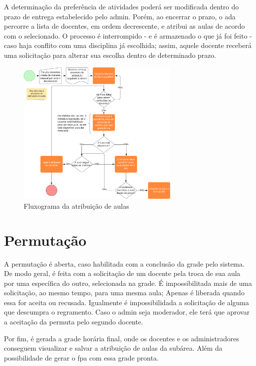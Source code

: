 A determinação da preferência de atividades poderá ser modificada dentro do prazo de entrega estabelecido pelo \gls{admin}. Porém, ao encerrar o prazo, o \ac{ada} percorre a lista de docentes, em ordem decrescente, e atribui as aulas de acordo com o selecionado. O processo é interrompido - e é armazenado o que já foi feito - caso haja conflito com uma disciplina já escolhida; assim, aquele docente receberá uma solicitação para alterar sua escolha dentro de determinado prazo.

\begin{figure}[h]
    \centering
    \includegraphics[width=0.7\textwidth]{anexos/Fluxograma/FluxogramaProcessoAtribuicaoAulas.png}
    \caption{Fluxograma da atribuição de aulas}
    \label{fig:figura3}
\end{figure}

\section{Permutação}

A permutação é aberta, caso habilitada com a conclusão da grade pelo sistema. De modo geral, é feita com a solicitação de um docente pela troca de sua aula por uma específica do outro, selecionada na grade. É impossibilitada mais de uma solicitação, ao mesmo tempo, para uma mesma aula; Apenas é liberada quando essa for aceita ou recusada. Igualmente é impossibilidada a solicitação de alguma que descumpra o regramento. 
Caso o \gls{admin} seja moderador, ele terá que aprovar a aceitação da permuta pelo segundo docente.


Por fim, é gerada a grade horária final, onde os docentes e os administradores conseguem visualizar e salvar a atribuição de aulas da subárea. Além da possibilidade de gerar o \ac{fpa} com essa grade pronta.

